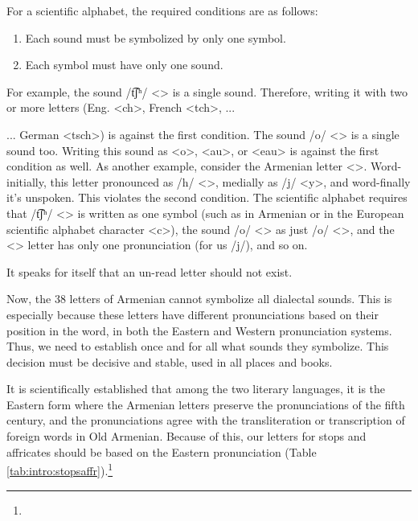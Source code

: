 For a scientific alphabet, the required conditions are as follows:
\begin{enumerate}
	\item Each sound must be symbolized by only one symbol. 
	\item Each symbol must have only one sound. 
\end{enumerate}


For example, the sound /t͡ʃʰ/ <> is a single sound. Therefore, writing it with two or more letters (Eng. <ch>, French <tch>, ... 


\begin{adjarianpage}\label{page:7}\end{adjarianpage}%


... German <tsch>) is against the first condition. The sound /o/ <> is a single sound too. Writing this sound as <o>, <au>, or <eau> is against the first condition as well. As another example, consider the Armenian letter <>. Word-initially, this letter pronounced as /h/ <>, medially as /j/ <y>, and word-finally it's unspoken. This violates the second condition. The scientific alphabet requires that /t͡ʃʰ/ <> is written as one symbol (such as in Armenian or in the European scientific alphabet character <c>), the sound /o/ <> as just /o/ <>, and the <> letter has only one pronunciation (for us /j/), and so on. 

It speaks for itself that an un-read letter should not exist. 

Now, the 38 letters of Armenian cannot symbolize all dialectal sounds. This is especially because these letters have different pronunciations based on their position in the word, in both the Eastern and Western pronunciation systems. Thus, we need to establish once and for all what sounds they symbolize. This decision must be decisive and stable, used in all places and books. 

It is scientifically established that among the two literary languages, it is the Eastern form where the Armenian letters preserve the pronunciations of the fifth century, and the pronunciations agree with the transliteration or transcription of foreign words in Old Armenian. Because of this, our letters for stops and affricates should be based on the Eastern pronunciation (Table \ref{tab:intro:stopsaffr}).\footnote{} 

